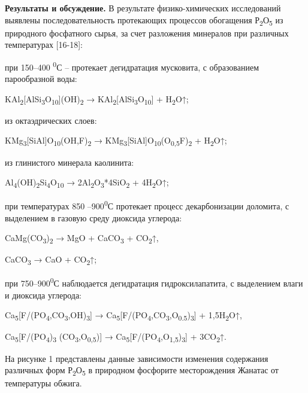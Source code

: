 {\bfseries Результаты и обсуждение.} В результате физико-химических
исследований выявлены последовательность протекающих процессов
обогащения Р\textsubscript{2}О\textsubscript{5} из природного фосфатного
сырья, за счет разложения минералов при различных температурах
{[}16-18{]}:

при 150--400 \textsuperscript{0}С -- протекает дегидратация мусковита, с
образованием парообразной воды:

KAl\textsubscript{2}{[}AlSi\textsubscript{3}O\textsubscript{10}{]}(OH)\textsubscript{2}
→ KAl\textsubscript{2}{[}AlSi\textsubscript{3}O\textsubscript{10}{]} +
H\textsubscript{2}O↑;

из октаэдрических слоев:

KMg\textsubscript{3}{[}SiAl{]}O\textsubscript{10}(OH,F)\textsubscript{2}
→
KMg\textsubscript{3}{[}SiAl{]}O\textsubscript{10}(O\textsubscript{0,5}F)\textsubscript{2}
+ H\textsubscript{2}O↑;

из глинистого минерала каолинита:

Al\textsubscript{4}(OH)\textsubscript{2}Si\textsubscript{4}O\textsubscript{10}
→ 2Al\textsubscript{2}O\textsubscript{3}*4SiO\textsubscript{2} +
4H\textsubscript{2}O↑;

при температурах 850 --900\textsuperscript{0}С протекает процесс
декарбонизации доломита, с выделением в газовую среду диоксида углерода:

CaMg(CO\textsubscript{3})\textsubscript{2} → MgO + CaCO\textsubscript{3}
+ CO\textsubscript{2}↑,

CaCO\textsubscript{3} → CaO + CO\textsubscript{2}↑;

при 750--900\textsuperscript{0}С наблюдается дегидратация
гидроксилапатита, с выделением влаги и диоксида углерода:

Ca\textsubscript{5}{[}F/(PO\textsubscript{4},CO\textsubscript{3},OH)\textsubscript{3}{]}
→
Ca\textsubscript{5}{[}F/(PO\textsubscript{4},CO\textsubscript{3},O\textsubscript{0.5})\textsubscript{3}{]}
+ 1,5H\textsubscript{2}O↑,

Ca\textsubscript{5}{[}F/(PO\textsubscript{4})\textsubscript{3}
(CO\textsubscript{3},O\textsubscript{0,5}){]} →
Ca\textsubscript{5}{[}F/(PO\textsubscript{4},O\textsubscript{1,5})\textsubscript{3}{]}
+ 3CO\textsubscript{2}↑.

На рисунке 1 представлены данные зависимости изменения содержания
различных форм Р\textsubscript{2}О\textsubscript{5} в природном
фосфорите месторождения Жанатас от температуры обжига.

